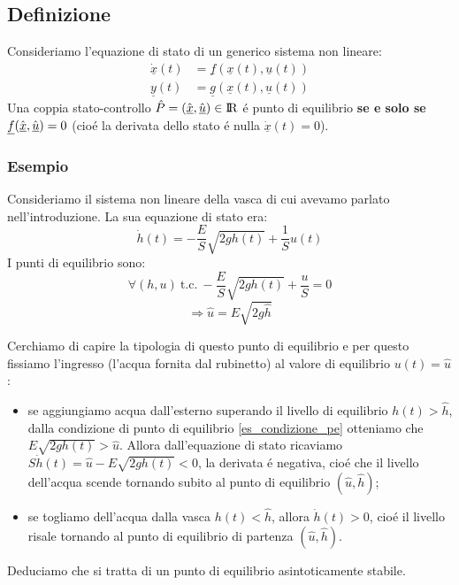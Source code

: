 \documentclass[../main.tex]{subfiles}
\begin{document}
	\subsection{Definizione}
		Consideriamo l'equazione di stato di un generico sistema non lineare:
		\begin{align*}
			\underline{\dot x}(t) &= \underline f(\underline x(t), \underline u(t))\\
			\underline y(t) &= \underline g(\underline x(t), \underline u(t))
		\end{align*}
		Una coppia stato-controllo $ \hat P = (\hat{\underline x}, \hat{\underline u}) \in \rm I\!R $ \'e punto di equilibrio \textbf{se e solo se} $ \underline f (\hat{\underline x}, \hat{\underline u}) = 0 $ (cio\'e la derivata dello stato \'e nulla $ \underline{\dot x}(t) = 0 $).
		
	\subsubsection*{Esempio}
		Consideriamo il sistema non lineare della vasca di cui avevamo parlato nell'introduzione. La sua equazione di stato era:
		\[ \dot h(t) = -\frac{E}{S} \sqrt{2g h(t)} + \frac{1}{S} u(t) \]
		I punti di equilibrio sono:
		\[ \forall (h, u)\ \text{t.c.}\ -\frac{E}{S} \sqrt{2g h(t)} + \frac{u}{S} = 0 \]
		\begin{equation}
			\label{es_condizione_pe}
			\Rightarrow \hat u = E \sqrt{2g \hat h}
		\end{equation}
		
		Cerchiamo di capire la tipologia di questo punto di equilibrio e per questo fissiamo l'ingresso (l'acqua fornita dal rubinetto) al valore di equilibrio $ u(t) = \hat u $:
		\begin{itemize}
			\item se aggiungiamo acqua dall'esterno superando il livello di equilibrio $ h(t) > \hat h $, dalla condizione di punto di equilibrio \ref{es_condizione_pe} otteniamo che $ E \sqrt{2gh(t)} > \hat u $. Allora dall'equazione di stato ricaviamo $ S \dot h(t) = \hat u - E \sqrt{2gh(t)} < 0 $, la derivata \'e negativa, cio\'e che il livello dell'acqua scende tornando subito al punto di equilibrio $ (\hat u, \hat h) $;
			\item se togliamo dell'acqua dalla vasca $ h(t) < \hat h $, allora $ \dot h(t) > 0 $, cio\'e il livello risale tornando al punto di equilibrio di partenza $ (\hat u, \hat h) $.
		\end{itemize}
		Deduciamo che si tratta di un punto di equilibrio asintoticamente stabile.
		
\end{document}
